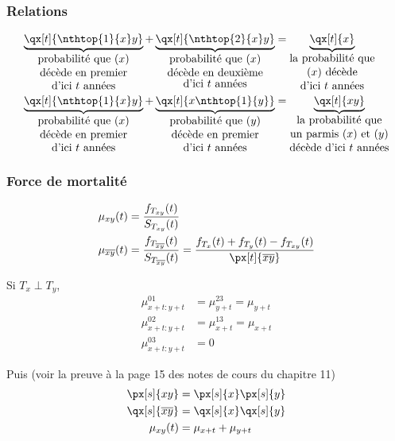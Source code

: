 \documentclass[10pt, french]{article}
\begin{document}
\begin{multicols*}{2}
\subsubsection*{Relations}
\begin{align*}
	\underbrace{\qx[t]{\nthtop{1}{x}y}}_{\shortstack{probabilité que $(x)$\\ décède en premier\\ d'ici $t$ années}}	+	\underbrace{\qx[t]{\nthtop{2}{x}y}}_{\shortstack{probabilité que $(x)$\\ décède en deuxième\\ d'ici $t$ années}}
	&=	\underbrace{\qx[t]{x}}_{\shortstack{la probabilité que\\ $(x)$ décède\\ d'ici $t$ années}}	\\
	\underbrace{\qx[t]{\nthtop{1}{x}y}}_{\shortstack{probabilité que $(x)$\\ décède en premier\\ d'ici $t$ années}}	+	\underbrace{\qx[t]{x\nthtop{1}{y}}}_{\shortstack{probabilité que $(y)$\\ décède en premier\\ d'ici $t$ années}}
	&=	\underbrace{\qx[t]{xy}}_{\shortstack{la probabilité que\\ un parmis $(x)$ et $(y)$\\ décède d'ici $t$ années}}	\\
\end{align*}


\subsubsection*{Force de mortalité}
\begin{align*}
	\mu_{xy}(t)
	&=	\frac{f_{T_{xy}}(t)}{S_{T_{xy}}(t)}	\\
	\mu_{\overline{xy}}(t)
	&=	\frac{f_{T_{\overline{xy}}}(t)}{S_{T_{\overline{xy}}}(t)}
	=	\frac{f_{T_{x}}(t) + f_{T_{y}}(t) - f_{T_{xy}}(t)}{\px[t]{\overline{xy}}}
\end{align*}

Si $T_{x} \perp T_{y}$, 
\begin{align*}
	\mu_{x + t : y + t}^{01}
	&=	\mu_{y + t}^{23}
	=	\mu_{y + t}	\\
	\mu_{x + t : y + t}^{02}
	&=	\mu_{x + t}^{13}
	=	\mu_{x + t}	\\
	\mu_{x + t : y + t}^{03}
	&=	0
\end{align*}

Puis (voir la preuve à la page 15 des notes de cours du chapitre 11)
\begin{align*}
	\px[s]{xy}
	&=	\px[s]{x}\px[s]{y}		\\
	\qx[s]{\overline{xy}}
	&=	\qx[s]{x}\qx[s]{y}		\\
	\mu_{xy}(t)
	&=	\mu_{x + t} + \mu_{y + t}	
\end{align*}


\end{multicols*}
\end{document}
